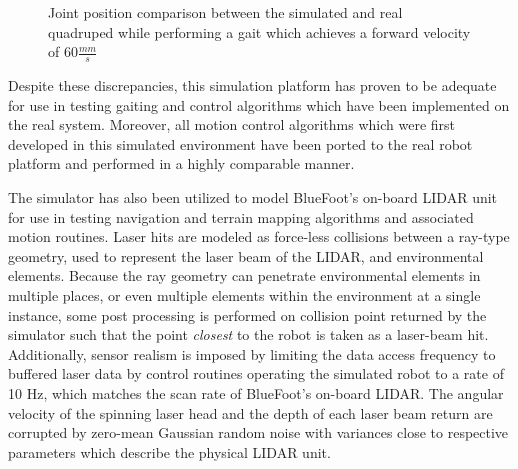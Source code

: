 			\begin{figure}[!t]
				\centering
				\caption{Joint position comparison between the simulated and real quadruped while performing a gait which achieves a forward velocity of $60\frac{mm}{s}$}
				\label{fig::sim_performance_comparison}
			\end{figure}
		Despite these discrepancies, this simulation platform has proven to be adequate for use in testing gaiting and control algorithms which have been implemented on the real system. Moreover, all motion control algorithms which were first developed in this simulated environment have been ported to the real robot platform and performed in a highly comparable manner.

		The simulator has also been utilized to model BlueFoot's on-board LIDAR unit for use in testing navigation and terrain mapping algorithms and associated motion routines. Laser hits are modeled as force-less collisions between a ray-type geometry, used to represent the laser beam of the LIDAR, and environmental elements. Because the ray geometry can penetrate environmental elements in multiple places, or even multiple elements within the environment at a single instance, some post processing is performed on collision point returned by the simulator such that the point \emph{closest} to the robot is taken as a laser-beam hit. Additionally, sensor realism is imposed by limiting the data access frequency to buffered laser data by control routines operating the simulated robot to a rate of 10 Hz, which matches the scan rate of BlueFoot's on-board LIDAR. The angular velocity of the spinning laser head and the depth of each laser beam return are corrupted by zero-mean Gaussian random noise with variances close to respective parameters which describe the physical LIDAR unit.
